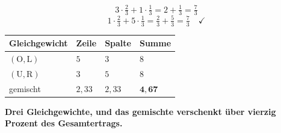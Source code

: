 \begin{aufgabe}
\[ 3\cdot\tfrac23 + 1\cdot\tfrac13 = 2+\tfrac13 = \tfrac73 \]
\[ 1\cdot\tfrac23 + 5\cdot\tfrac13 = \tfrac23+\tfrac53 = \tfrac73 \quad \checkmark \]

\begin{center}
{\small
\renewcommand{\arraystretch}{1.5}
\begin{tabular}{@{}P{2.8cm}P{1.8cm}P{1.8cm}P{1.8cm}@{}}
\toprule
\textbf{Gleichgewicht} & \textbf{Zeile} & \textbf{Spalte} & \textbf{Summe}\\
\midrule
$(\text{O},\text{L})$ & $5$ & $3$ & $8$\\
$(\text{U},\text{R})$ & $3$ & $5$ & $8$\\
gemischt & $2{,}33$ & $2{,}33$ & $\mathbf{4{,}67}$\\
\bottomrule
\end{tabular}}
\end{center}

\begin{center}
\begin{minipage}{0.9\textwidth}
\textbf{Drei Gleichgewichte, und das gemischte verschenkt über vierzig Prozent des Gesamtertrags.}
\end{minipage}
\end{center}

\begin{center}
\begin{minipage}{0.88\textwidth}
\end{minipage}
\end{center}
\end{aufgabe}

